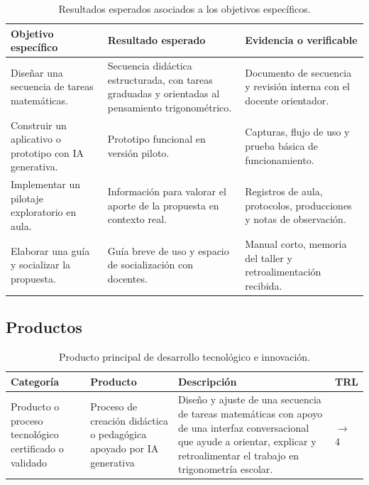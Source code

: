 \documentclass[11pt,spanish,letterpaper,openany]{book}
\begin{document}
\begin{table}[H]
\centering
\caption{Resultados esperados asociados a los objetivos específicos.}
\begin{tabularx}{\textwidth}{>{\raggedright\arraybackslash}p{4.2cm} >{\raggedright\arraybackslash}p{5.1cm} >{\raggedright\arraybackslash}X}
\toprule
Objetivo específico & Resultado esperado & Evidencia o verificable \\
\midrule
Diseñar una secuencia de tareas matemáticas. & Secuencia didáctica estructurada, con tareas graduadas y orientadas al pensamiento trigonométrico. & Documento de secuencia y revisión interna con el docente orientador. \\
Construir un aplicativo o prototipo con IA generativa. & Prototipo funcional en versión piloto. & Capturas, flujo de uso y prueba básica de funcionamiento. \\
Implementar un pilotaje exploratorio en aula. & Información para valorar el aporte de la propuesta en contexto real. & Registros de aula, protocolos, producciones y notas de observación. \\
Elaborar una guía y socializar la propuesta. & Guía breve de uso y espacio de socialización con docentes. & Manual corto, memoria del taller y retroalimentación recibida. \\
\bottomrule
\end{tabularx}
\end{table}

\subsection{Productos}

\begin{table}[H]
\centering
\caption{Producto principal de desarrollo tecnológico e innovación.}
\begin{tabularx}{\textwidth}{>{\raggedright\arraybackslash}p{3.5cm} >{\raggedright\arraybackslash}p{4.5cm} >{\raggedright\arraybackslash}X >{\centering\arraybackslash}p{1.5cm}}
\toprule
Categoría & Producto & Descripción & TRL \\
\midrule
Producto o proceso tecnológico certificado o validado & Proceso de creación didáctica o pedagógica apoyado por IA generativa & Diseño y ajuste de una secuencia de tareas matemáticas con apoyo de una interfaz conversacional que ayude a orientar, explicar y retroalimentar el trabajo en trigonometría escolar. & 3 $\to$ 4 \\
\bottomrule
\end{tabularx}
\end{table}
\end{document}
